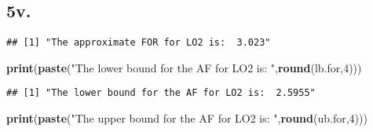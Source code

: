 \documentclass[]{article}
\newenvironment{Shaded}{\begin{snugshade}}{\end{snugshade}}
\newcommand{\CommentTok}[1]{\textcolor[rgb]{0.56,0.35,0.01}{\textit{#1}}}
\newcommand{\DecValTok}[1]{\textcolor[rgb]{0.00,0.00,0.81}{#1}}
\newcommand{\KeywordTok}[1]{\textcolor[rgb]{0.13,0.29,0.53}{\textbf{#1}}}
\newcommand{\NormalTok}[1]{#1}
\newcommand{\OperatorTok}[1]{\textcolor[rgb]{0.81,0.36,0.00}{\textbf{#1}}}
\newcommand{\StringTok}[1]{\textcolor[rgb]{0.31,0.60,0.02}{#1}}
\begin{document}
\hypertarget{v.}{%
\subsection{5v.}\label{v.}}

\begin{Shaded}
\end{Shaded}

\begin{verbatim}
## [1] "The approximate FOR for LO2 is:  3.023"
\end{verbatim}

\begin{Shaded}
\begin{Highlighting}[]
\KeywordTok{print}\NormalTok{(}\KeywordTok{paste}\NormalTok{(}\StringTok{"The lower bound for the AF for LO2 is: "}\NormalTok{,}\KeywordTok{round}\NormalTok{(lb.for,}\DecValTok{4}\NormalTok{)))}
\end{Highlighting}
\end{Shaded}

\begin{verbatim}
## [1] "The lower bound for the AF for LO2 is:  2.5955"
\end{verbatim}

\begin{Shaded}
\begin{Highlighting}[]
\KeywordTok{print}\NormalTok{(}\KeywordTok{paste}\NormalTok{(}\StringTok{"The upper bound for the AF for LO2 is: "}\NormalTok{,}\KeywordTok{round}\NormalTok{(ub.for,}\DecValTok{4}\NormalTok{)))}
\end{Highlighting}
\end{Shaded}
\end{document}
